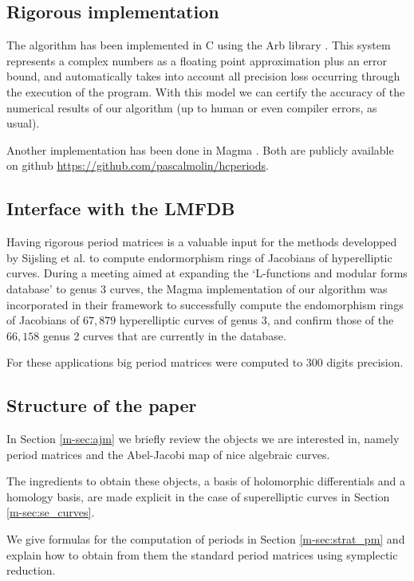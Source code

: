 \documentclass[main.tex]{subfiles}
\begin{document}
  \subsection{Rigorous implementation}

  The algorithm has been implemented in C using the Arb library \cite{Johansson2013arb}.
  This system represents a complex numbers as a floating point approximation
  plus an error bound, and automatically
  takes into account all precision loss occurring through the
  execution of the program. With this model we can certify
  the accuracy of the numerical results of our algorithm (up to human or even
  compiler errors, as usual).

  Another implementation has been done in Magma \cite{Magma}. Both are publicly available
  on github \url{https://github.com/pascalmolin/hcperiods}.

  \subsection{Interface with the LMFDB}

  Having rigorous period matrices is a valuable input for the methods developped by
  Sijsling et al. \cite{CMSVEndos} to compute endormorphism rings of Jacobians of hyperelliptic
  curves.
  During a meeting aimed at expanding the `L-functions and modular forms database' \cite[LMFDB]{lmfdb}
  to genus $3$ curves, the Magma implementation of our algorithm was incorporated in their framework
  to successfully compute the endomorphism rings of Jacobians of $67,879$ hyperelliptic
  curves of genus $3$, and confirm those of the $66,158$ genus
  2 curves that are currently in the database.

  For these applications big period matrices were computed to $300$ digits precision.

  \subsection{Structure of the paper}

  In Section \ref{m-sec:ajm} we briefly review the objects we are interested
  in, namely period matrices and the Abel-Jacobi map of nice algebraic curves.

  The ingredients to obtain these objects, a basis of holomorphic differentials
  and a homology basis, are made explicit in the case of superelliptic curves
  in Section \ref{m-sec:se_curves}.

  We give formulas for the computation of periods in Section
  \ref{m-sec:strat_pm} and explain how to obtain from them the standard period
  matrices using symplectic reduction.
\end{document}

